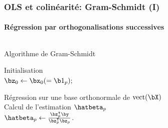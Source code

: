 \documentclass{beamer}\usepackage[]{graphicx}\usepackage[]{color}
\begin{document}
\begin{frame}
  \frametitle{OLS et colinéarité: Gram-Schmidt (I)}
  \framesubtitle{Régression par orthogonalisations successives}

  \begin{columns}[c]
    \begin{column}{.45\textwidth}
      \hspace{1cm}\begin{block}{Algorithme de Gram-Schmidt}
        \begin{scriptsize}
          \begin{algorithm}[H]
            \SetSideCommentLeft
          \DontPrintSemicolon
           \textcolor{mred}{Initialisation}\\
          $\bz_0\leftarrow \bx_0 (=\b1_{p}); $

          \BlankLine
             \textcolor{mred}{Régression   sur  une   base
            orthonormale de $\mathrm{vect}(\bX)$}\\
           \textcolor{mred}{Calcul de l'estimation $\hatbeta_p$} \\
          $\hatbeta_p \leftarrow \frac{\bz_p^\intercal \by}{\bz_p^\intercal\bz_p}$.
          \BlankLine
        \end{algorithm}
      \end{scriptsize}
    \end{block}


\end{column}
\end{columns}
\end{frame}
\end{document}
